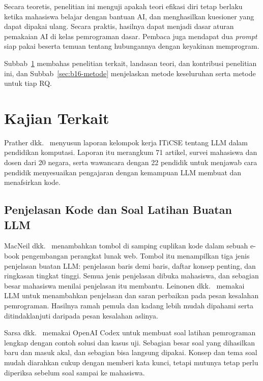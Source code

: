 Secara teoretis, penelitian ini menguji apakah teori efikasi diri tetap berlaku ketika mahasiswa belajar dengan bantuan AI, dan menghasilkan kuesioner yang dapat dipakai ulang. Secara praktis, hasilnya dapat menjadi dasar aturan pemakaian AI di kelas pemrograman dasar. Pembaca juga mendapat dua \textit{prompt} siap pakai beserta temuan tentang hubungannya dengan keyakinan memprogram.

Subbab~\ref{sec:b16-terkait} membahas penelitian terkait, landasan teori, dan kontribusi penelitian ini, dan Subbab~\ref{sec:b16-metode} menjelaskan metode keseluruhan serta metode untuk tiap RQ.

\section{Kajian Terkait}
\label{sec:b16-terkait}

Prather dkk.~\cite{prather2023} menyusun laporan kelompok kerja ITiCSE tentang LLM dalam pendidikan komputasi. Laporan itu merangkum 71 artikel, survei mahasiswa dan dosen dari 20 negara, serta wawancara dengan 22 pendidik untuk menjawab cara pendidik menyesuaikan pengajaran dengan kemampuan LLM membuat dan menafsirkan kode.

\subsection{Penjelasan Kode dan Soal Latihan Buatan LLM}

MacNeil dkk.~\cite{macneil2023} menambahkan tombol di samping cuplikan kode dalam sebuah e-book pengembangan perangkat lunak web. Tombol itu menampilkan tiga jenis penjelasan buatan LLM: penjelasan baris demi baris, daftar konsep penting, dan ringkasan tingkat tinggi. Semua jenis penjelasan dibuka mahasiswa, dan sebagian besar mahasiswa menilai penjelasan itu membantu. Leinonen dkk.~\cite{leinonen2023} memakai LLM untuk menambahkan penjelasan dan saran perbaikan pada pesan kesalahan pemrograman. Hasilnya ramah pemula dan kadang lebih mudah dipahami serta ditindaklanjuti daripada pesan kesalahan aslinya.

Sarsa dkk.~\cite{sarsa2022} memakai OpenAI Codex untuk membuat soal latihan pemrograman lengkap dengan contoh solusi dan kasus uji. Sebagian besar soal yang dihasilkan baru dan masuk akal, dan sebagian bisa langsung dipakai. Konsep dan tema soal mudah diarahkan cukup dengan memberi kata kunci, tetapi mutunya tetap perlu diperiksa sebelum soal sampai ke mahasiswa.

